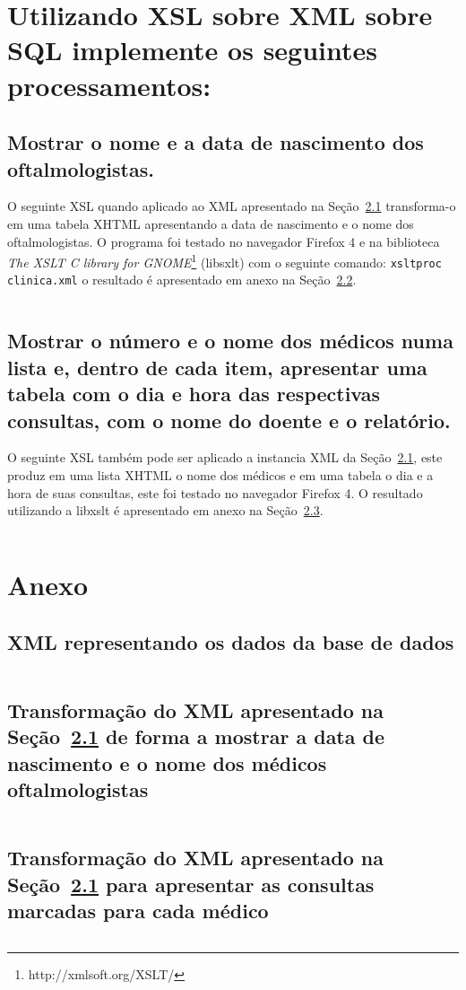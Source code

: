 \documentclass[a4paper,12pt]{article}
\begin{document}
\inputminted{sql}{clinica.sql}

\section{Utilizando XSL sobre XML sobre SQL implemente os seguintes
processamentos:}

\subsection{Mostrar o nome e a data de nascimento dos oftalmologistas.}

O seguinte XSL quando aplicado ao XML apresentado na
Seção~\ref{anex:xml_clinica} transforma-o em uma tabela XHTML apresentando a
data de nascimento e o nome dos oftalmologistas. O programa foi testado no
navegador Firefox 4 e na biblioteca \emph{The XSLT C library for
GNOME}\footnote{http://xmlsoft.org/XSLT/} (libsxlt) com o 
seguinte comando: \verb~xsltproc clinica.xml~ o resultado é apresentado em anexo
na Seção~\ref{anex:dt_oftalmo.xhml}.
\inputminted{xml}{dt_oftalmo.xsl}

\subsection{Mostrar o número e o nome dos médicos numa lista e, dentro de cada
item, apresentar uma tabela com o dia e hora das respectivas consultas, com o
nome do doente e o relatório.}

O seguinte XSL também pode ser aplicado a instancia XML da
Seção~\ref{anex:xml_clinica}, este produz em uma lista XHTML o nome dos médicos
e em uma tabela o dia e a hora de suas consultas, este foi testado no navegador
Firefox 4. O resultado utilizando a libxslt é apresentado em anexo na
Seção~\ref{anex:medico_consulta.xhtml}.
\inputminted{xml}{medico_consulta.xsl}

\newpage 
\section{Anexo}

\subsection{XML representando os dados da base de dados}\label{anex:xml_clinica}
\inputminted{xml}{clinica.xml}

\subsection{Transformação do XML apresentado na Seção~\ref{anex:xml_clinica} de
forma a mostrar a data de nascimento e o nome dos médicos
oftalmologistas}\label{anex:dt_oftalmo.xhml}
\inputminted{xml}{dt_oftalmo.xhtml}

\subsection{Transformação do XML apresentado na Seção~\ref{anex:xml_clinica}
para apresentar as consultas marcadas para cada
médico}\label{anex:medico_consulta.xhtml}
\inputminted{xml}{medico_consulta.xhtml}
\end{document}
